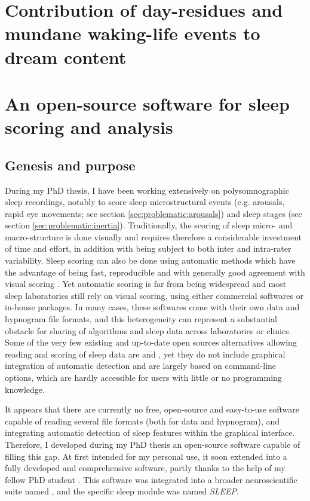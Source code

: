 \section{Contribution of day-residues and mundane waking-life events to dream content}
\label{sec:problematic:wle}

\section{An open-source software for sleep scoring and analysis}
\label{sec:problematic:software}

\subsection{Genesis and purpose}
\label{sec:problematic:software:genesis}

During my PhD thesis, I have been working extensively on polysomnographic sleep recordings, notably to score sleep microstructural events (e.g. arousals, rapid eye movements; see section \ref{sec:problematic:arousals}) and sleep stages (see section \ref{sec:problematic:inertia}). Traditionally, the scoring of sleep micro- and macro-structure is done visually and requires therefore a considerable investment of time and effort, in addition with being subject to both inter and intra-rater variability. Sleep scoring can also be done using automatic methods which have the advantage of being fast, reproducible and with generally good agreement with visual scoring \citep{berthomier_automatic_2007, lajnef_learning_2015}. Yet automatic scoring is far from being widespread and most sleep laboratories still rely on visual scoring, using either commercial softwares or in-house packages. In many cases, these softwares come with their own data and hypnogram file formats, and this heterogeneity can represent a substantial obstacle for sharing of algorithms and sleep data across laboratories or clinics. Some of the very few existing and up-to-date open sources alternatives allowing reading and scoring of sleep data are  and , yet they do not include graphical integration of automatic detection and are largely based on command-line options, which are hardly accessible for users with little or no programming knowledge.

It appears that there are currently no free, open-source and easy-to-use software capable of reading several file formats (both for data and hypnogram), and integrating automatic detection of sleep features within the graphical interface. Therefore, I developed during my PhD thesis an open-source software capable of filling this gap. At first intended for my personal use, it soon extended into a fully developed and comprehensive software, partly thanks to the help of my fellow PhD student . This software was integrated into a broader neuroscientific suite named , and the specific sleep module was named \textit{SLEEP}.

